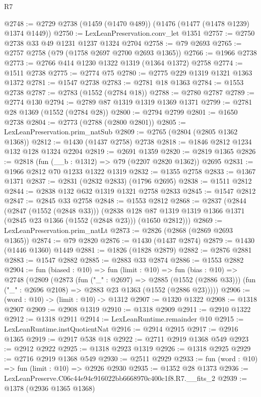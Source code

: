 \begin{lexlean}{R7}
\begin{coremodule}
@2748 := @2729 @2738 (@1459 (@1470 @489)) (@1476 (@1477 (@1478 @1239) @1374 @1449))
@2750 := LexLeanPreservation.conv_let @1351
@2757 := @2750 @2738 @33 @49 @1231 @1237 @1324 @2704
@2758 := @79 @2693
@2765 := @2757 @2758 (@79 (@1758 @2697 @2700 @2693 @1365))
@2766 := @1966 @2738
@2773 := @2766 @414 @1230 @1322 @1319 (@1364 @1372) @2758
@2774 := @1511 @2738
@2775 := @2774 @75
@2780 := @2775 @229 @1319 @1321 @1363 @1372
@2781 := @1547 @2738
@2783 := @2781 @18 @1363
@2784 := @1553 @2738
@2787 := @2783 (@1552 (@2784 @18))
@2788 := @2780 @2787
@2789 := @2774 @130
@2794 := @2789 @87 @1319 @1319 @1369 @1371
@2799 := @2781 @28 @1369 (@1552 (@2784 @28))
@2800 := @2794 @2799
@2801 := @1650 @2738
@2804 := @2773 (@2788 (@2800 @2801))
@2805 := LexLeanPreservation.prim_natSub
@2809 := @2765 (@2804 (@2805 @1362 @1368))
@2812 := @1430 (@1437 @2758) @2738
@2818 := @1846 @2812 @1234 @132 @128 @1324 @2204
@2819 := @2691 @1359
@2820 := @2819 @1365
@2826 := @2818 (fun (__b : @1312) => @79 (@2207 @2820 @1362)) @2695
@2831 := @1966 @2812 @70 @1233 @1322 @1319
@2832 := @1355 @2758
@2833 := @1367 @1371
@2837 := @2831 (@2832 @2833) (@1796 @2695)
@2838 := @1511 @2812
@2844 := @2838 @132 @632 @1319 @1321 @2758 @2833
@2845 := @1547 @2812
@2847 := @2845 @33 @2758
@2848 := @1553 @2812
@2868 := @2837
    (@2844
      (@2847 (@1552 (@2848 @33)))
      (@2838 @128 @87 @1319 @1319 @1366 @1371 (@2845 @23 @1366 (@1552 (@2848 @23))) (@1650 @2812)))
@2869 := LexLeanPreservation.prim_natLt
@2873 := @2826 (@2868 (@2869 @2693 @1365))
@2874 := @79 @2820
@2876 := @1430 (@1437 @2874)
@2879 := @1430 (@1446 @1360) @1449
@2881 := @1826 (@1828 @2879)
@2882 := @2876 @2881
@2883 := @1547 @2882
@2885 := @2883 @33 @2874
@2886 := @1553 @2882
@2904 := fun (biased : @10) =>
  fun (limit : @10) =>
  fun (bias : @10) =>
  @2748
    (@2809
      (@2873
        (fun ("_" : @2697) => @2885 (@1552 (@2886 @33)))
        (fun ("_" : @2696 @2108) => @2883 @23 @1363 (@1552 (@2886 @23)))))
@2906 := (word : @10) -> (limit : @10) -> @1312
@2907 := @1320 @1322
@2908 := @1318 @2907
@2909 := @2908 @1319
@2910 := @1318 @2909
@2911 := @2910 @1322
@2912 := @1318 @2911
@2914 := LexLeanRuntime.remainder @10
@2915 := LexLeanRuntime.instQuotientNat
@2916 := @2914 @2915
@2917 := @2916 @1365
@2919 := @2917 @538 @18
@2922 := @2711 @2919 @1368 @549
@2923 := @2912 @2922
@2925 := @1318 @2923 @1319
@2926 := @1318 @2925
@2929 := @2716 @2919 @1368 @549
@2930 := @2511 @2929
@2933 := fun (word : @10) => fun (limit : @10) => @2926 @2930
@2935 := @1352 @28 @1373
@2936 := LexLeanPreserve.C06c44e94c916022bb6668970c400c1f8.R7.__fits_2
@2939 := @1378 (@2936 @1365 @1368)

\end{coremodule}
\end{lexlean}
